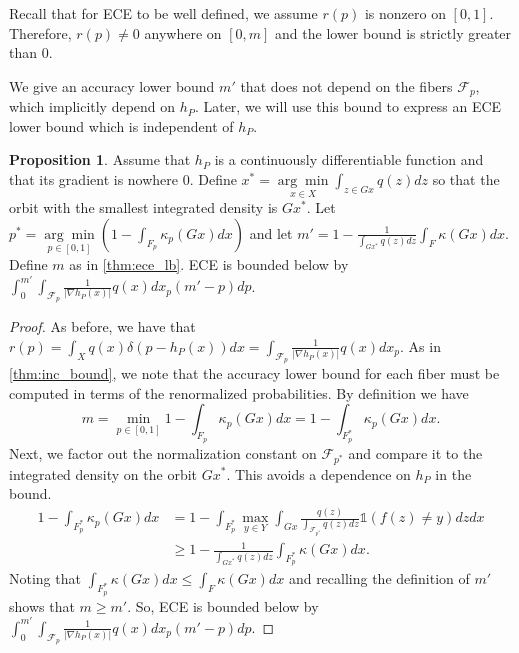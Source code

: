\documentclass[10pt]{article} %
\theoremstyle{definition}
\newtheorem{proposition}{Proposition}
\begin{document}
Recall that for ECE to be well defined, we assume $r(p)$ is nonzero on $[0,1]$. Therefore, $r(p) \neq 0$ anywhere on $[0,m]$ and the lower bound is strictly greater than $0$.

We give an accuracy lower bound $m'$ that does not depend on the fibers $\mathcal{F}_p$, which implicitly depend on $h_P$. Later, we will use this bound to express an ECE lower bound which is independent of $h_P$.

\begin{proposition} \label{prop:h_p_low}
Assume that $h_P$ is a continuously differentiable function and that its gradient is nowhere $0$. Define $x^* = \underset{x \in X}{\arg \min} \int_{z \in Gx}q(z)dz$ so that the orbit with the smallest integrated density is $Gx^*$. Let $p^* = \underset{p \in [0,1]}{\arg \min} (1- \int_{F_p}\kappa_p (Gx)dx)$ and let $m' = 1 - \frac{1}{\int_{Gx^*}q(z)dz}\int_F \kappa (Gx)dx$. Define $m$ as in \cref{thm:ece_lb}. ECE is bounded below by $\int_0^{m'} \int_{\mathcal{F}_p}\frac{1}{|\nabla h_P(x)|}q(x)dx_p({m'} - p)dp$. 
\end{proposition}

\begin{proof}
As before, we have that $r(p) = \int_Xq(x)\delta(p - h_P(x))dx = \int_{\mathcal{F}_p}\frac{1}{|\nabla h_P(x)|}q(x)dx_p$. As in \cref{thm:inc_bound}, we note that the accuracy lower bound for each fiber must be computed in terms of the renormalized probabilities. By definition we have 
%
\begin{equation*}
m = \underset{p \in [0,1]}{\min} 1 - \int_{F_p} \kappa_p(Gx)dx = 1 - \int_{F_p^*}\kappa_p(Gx)dx .    
\end{equation*}
%
Next, we factor out the normalization constant on $\mathcal{F}_{p^*}$ and compare it to the integrated density on the orbit $Gx^*$. This avoids a dependence on $h_P$ in the bound.
%
\begin{align*}
 1 - \int_{F_p^*}\kappa_p(Gx)dx &=1 - \int_{F_p^*}\underset{y \in Y}{\max}\int_{Gx}\frac{q(z)}{\int_{\mathcal{F}_{p^*}}q(z)dz}\mathds{1}(f(z) \neq y)dzdx  \\
 &\geq1 - \frac{1}{\int_{Gx^*}q(z)dz}\int_{F_p^*}\kappa(Gx)dx.
\end{align*}
%
Noting that $\int_{F_p^*}\kappa(Gx)dx \leq \int_{F}\kappa(Gx)dx$ and recalling the definition of $m'$ shows that $m \geq m'$. So, ECE is bounded below by $\int_0^{m'} \int_{\mathcal{F}_p}\frac{1}{|\nabla h_P(x)|}q(x)dx_p({m'} - p)dp$.
\end{proof}
\end{document}
